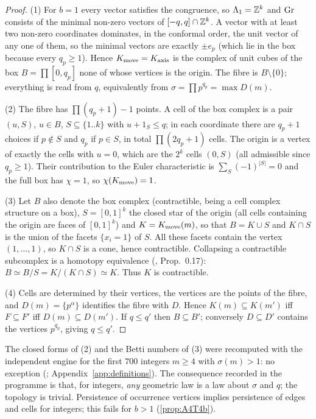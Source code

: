 \begin{proof}
(1) For $b=1$ every vector satisfies the congruence, so $\Lambda_1=\mathbb Z^k$ and $\mathrm{Gr}$ consists of the minimal non-zero vectors of $[-q,q]\cap\mathbb Z^k$. A vector with at least two non-zero coordinates dominates, in the conformal order, the unit vector of any one of them, so the minimal vectors are exactly $\pm e_p$ (which lie in the box because every $q_p\ge1$). Hence $K_{\mathrm{move}}=K_{\mathrm{axis}}$ is the complex of unit cubes of the box $B=\prod[0,q_p]$ none of whose vertices is the origin. The fibre is $B\setminus\{0\}$; everything is read from $q$, equivalently from $\sigma=\prod p^{q_p}=\max D(m)$.

(2) The fibre has $\prod(q_p+1)-1$ points. A cell of the box complex is a pair $(u,S)$, $u\in B$, $S\subseteq\{1..k\}$ with $u+1_S\le q$; in each coordinate there are $q_p+1$ choices if $p\notin S$ and $q_p$ if $p\in S$, in total $\prod(2q_p+1)$ cells. The origin is a vertex of exactly the cells with $u=0$, which are the $2^k$ cells $(0,S)$ (all admissible since $q_p\ge1$). Their contribution to the Euler characteristic is $\sum_S(-1)^{|S|}=0$ and the full box has $\chi=1$, so $\chi(K_{\mathrm{move}})=1$.

(3) Let $B$ also denote the box complex (contractible, being a cell complex structure on a box), $S=[0,1]^k$ the closed star of the origin (all cells containing the origin are faces of $[0,1]^k$) and $K=K_{\mathrm{move}}(m)$, so that $B=K\cup S$ and $K\cap S$ is the union of the facets $\{x_i=1\}$ of $S$. All these facets contain the vertex $(1,\dots,1)$, so $K\cap S$ is a cone, hence contractible. Collapsing a contractible subcomplex is a homotopy equivalence (\cite{Hatcher2002}, Prop.~0.17): $B\simeq B/S=K/(K\cap S)\simeq K$. Thus $K$ is contractible.

(4) Cells are determined by their vertices, the vertices are the points of the fibre, and $D(m)=\{p^\alpha\}$ identifies the fibre with $D$. Hence $K(m)\subseteq K(m')$ iff $F\subseteq F'$ iff $D(m)\subseteq D(m')$. If $q\le q'$ then $B\subseteq B'$; conversely $D\subseteq D'$ contains the vertices $p^{q_p}$, giving $q\le q'$. \qedhere
\end{proof}
\begin{remark}\label{rem:B2T1check}
The closed forms of (2) and the Betti numbers of (3) were recomputed with the independent engine for the first $700$ integers $m\ge4$ with $\sigma(m)>1$: no exception (; Appendix~\ref{app:definitions}). The consequence recorded in the programme is that, for integers, \emph{any} geometric law is a law about $\sigma$ and $q$; the topology is trivial. Persistence of occurrence vertices implies persistence of edges and cells for integers; this fails for $b>1$ (\cref{prop:A4T4b}).
\end{remark}
